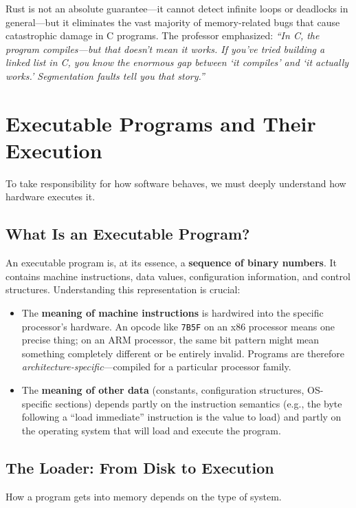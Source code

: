 Rust is not an absolute guarantee---it cannot detect infinite loops or deadlocks in general---but it eliminates the vast majority of memory-related bugs that cause catastrophic damage in C programs. The professor emphasized: \emph{``In C, the program compiles---but that doesn't mean it works. If you've tried building a linked list in C, you know the enormous gap between `it compiles' and `it actually works.' Segmentation faults tell you that story.''}

\section{Executable Programs and Their Execution}

To take responsibility for how software behaves, we must deeply understand how hardware executes it.

\subsection{What Is an Executable Program?}

An executable program is, at its essence, a \textbf{sequence of binary numbers}. It contains machine instructions, data values, configuration information, and control structures. Understanding this representation is crucial:

\begin{itemize}
    \item The \textbf{meaning of machine instructions} is hardwired into the specific processor's hardware. An opcode like \texttt{7B5F} on an x86 processor means one precise thing; on an ARM processor, the same bit pattern might mean something completely different or be entirely invalid. Programs are therefore \emph{architecture-specific}---compiled for a particular processor family.
    \item The \textbf{meaning of other data} (constants, configuration structures, OS-specific sections) depends partly on the instruction semantics (e.g., the byte following a ``load immediate'' instruction is the value to load) and partly on the operating system that will load and execute the program.
\end{itemize}

\subsection{The Loader: From Disk to Execution}

How a program gets into memory depends on the type of system.

